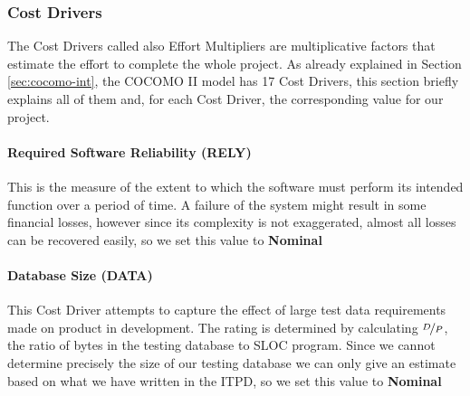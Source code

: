\subsubsection{Cost Drivers}
\label{sec:cd}
The Cost Drivers called also Effort Multipliers are multiplicative factors that estimate the effort to complete the whole project. As already explained in Section \ref{sec:cocomo-int}, the COCOMO II model has 17 Cost Drivers, this section briefly explains all of them and, for each Cost Driver, the corresponding value for our project. \\

\paragraph{Required Software Reliability (RELY)} This is the measure of the extent to which the software must perform its intended function over a period of time. A failure of the system might result in some financial losses, however since its complexity is not exaggerated, almost all losses can be recovered easily, so we set this value to \textbf{Nominal} 

\paragraph{Database Size (DATA)} This Cost Driver attempts to capture the effect of large test data requirements made on product in development. The rating is determined by calculating $\nicefrac{D}{P}$, the ratio of bytes in the testing database to SLOC program. Since we cannot determine precisely the size of our testing database we can only give an estimate based on what we have written in the ITPD, so we set this value to \textbf{Nominal}


